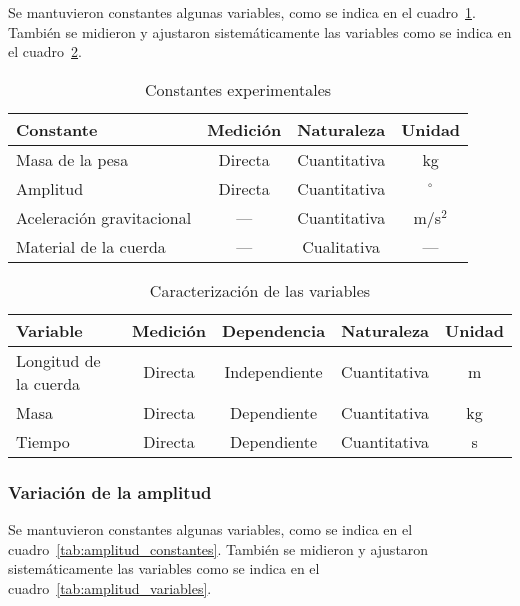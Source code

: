 \documentclass[letterpaper]{report}
\numberwithin{table}{section}
\begin{document}
Se mantuvieron constantes algunas variables, como se indica en el
cuadro~\ref{tab:longitud_constantes}. También se midieron y ajustaron
sistemáticamente las variables como se indica en el
cuadro~\ref{tab:longitud_variables}.

\begin{table}[h!]
  \centering
  \begin{tabular}{lccc}
    \toprule
    \textbf{Constante} & \textbf{Medición} & \textbf{Naturaleza} &
    \textbf{Unidad}\\
    \midrule
    Masa de la pesa & Directa & Cuantitativa & kg \\
    Amplitud & Directa & Cuantitativa & $^{\circ}$ \\
    Aceleración gravitacional & — & Cuantitativa & m/s$^{2}$ \\
    Material de la cuerda & — & Cualitativa & — \\
    \bottomrule
  \end{tabular}
  \caption{Constantes experimentales}\label{tab:longitud_constantes}
\end{table}

\begin{table}[ht!]
  \centering
  \begin{tabular}{lcccc}
    \toprule
    \textbf{Variable} & \textbf{Medición} & \textbf{Dependencia}
    & \textbf{Naturaleza} & \textbf{Unidad} \\
    \midrule
    Longitud de la cuerda & Directa & Independiente & Cuantitativa & m\\
    Masa & Directa & Dependiente  & Cuantitativa & kg\\
    Tiempo & Directa & Dependiente & Cuantitativa & s\\
    \bottomrule
  \end{tabular}
  \caption{Caracterización de las variables}\label{tab:longitud_variables}
\end{table}

\subsubsection{Variación de la amplitud}

Se mantuvieron constantes algunas variables, como se indica en el
cuadro~\ref{tab:amplitud_constantes}. También se midieron y ajustaron
sistemáticamente las variables como se indica en el
cuadro~\ref{tab:amplitud_variables}.
\end{document}
